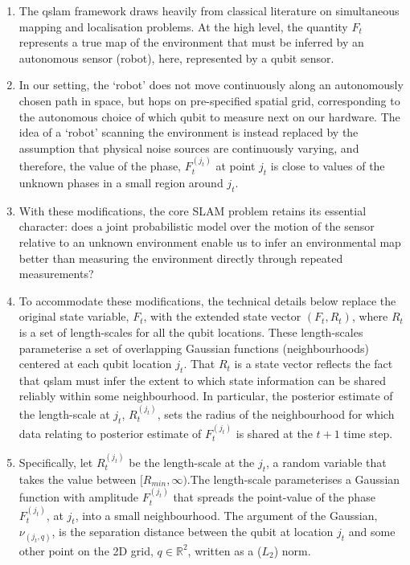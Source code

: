 \begin{enumerate}
	\item The qslam framework draws heavily from classical literature on simultaneous mapping and localisation problems.	At the high level, the quantity $F_t$ represents a true map of the environment that must be inferred by an autonomous sensor (robot), here, represented by a qubit sensor. 
	\item In our setting, the `robot' does not move continuously along an autonomously chosen path in space, but hops on pre-specified spatial grid, corresponding to the autonomous choice of which qubit to measure next on our hardware. The idea of a `robot' scanning the environment is instead replaced by the assumption that physical noise sources are continuously varying, and therefore, the value of the phase, $F_t^{(j_t)}$ at point $j_t$  is close to values of the unknown phases in a small region around $j_t$.  
	\item With these modifications, the core SLAM problem retains its essential character: does a joint probabilistic model over the motion of the sensor relative to an unknown environment enable us to infer an environmental map better than measuring the environment directly through repeated measurements?
	\item To accommodate these modifications, the technical details below replace the original state variable, $F_t$, with the extended state vector $(F_t, R_t)$, where $R_t$ is a set of length-scales for all the qubit locations. These length-scales parameterise a set of overlapping Gaussian functions (neighbourhoods) centered at each qubit location $j_t$. That $R_t$ is a state vector reflects the fact that qslam must infer the extent to which state information can be shared reliably within some neighbourhood. In particular, the posterior estimate of the length-scale at $j_t$, $R_t^{(j_t)}$, sets the radius of the neighbourhood for which data relating to posterior estimate of $F_t^{(j_t)}$ is shared at the $t+1$ time step. 
	\item Specifically, let $R_t^{(j_t)}$ be the length-scale at the $j_t$, a random variable that takes the value between $[R_{min}, \infty)$.The length-scale parameterises a Gaussian function with amplitude $F_t^{(j_t)}$  that spreads the point-value of the phase $F_t^{(j_t)}$, at $j_t$, into a small neighbourhood. The argument of the Gaussian, $\nu_{(j_t,q)}$, is the separation distance between the qubit at location $j_t$ and some other point on the 2D grid, $q \in \mathbb{R}^2$, written as a ($L_2$) norm. 

\end{enumerate}
